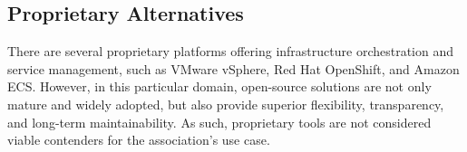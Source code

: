 \subsection*{Proprietary Alternatives}

There are several proprietary platforms offering infrastructure orchestration and service management, such as VMware vSphere, Red Hat OpenShift, and Amazon ECS. However, in this particular domain, open-source solutions are not only mature and widely adopted, but also provide superior flexibility, transparency, and long-term maintainability. As such, proprietary tools are not considered viable contenders for the association's use case.
